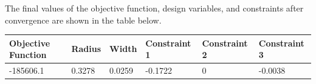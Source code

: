 \documentclass[11pt]{article}
\begin{document}
\begin{solution}
The final values of the objective function, design variables, and constraints after convergence are shown in the table below.
\begin{center}
\begin{table}
    \begin{tabular}{|l|l|l|l|l|l|}
        \hline
	Objective Function & Radius & Width & Constraint 1 & Constraint 2 & Constraint 3 \\ \hline
	-185606.1 & 0.3278 & 0.0259 & -0.1722 & 0 & -0.0038 \\ 
	\hline
    \end{tabular}
\end{table}
\end{center}

\end{solution}
\end{document}

